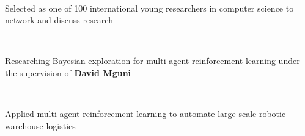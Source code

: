 \documentclass[]{lukas-cv-openfont}
\begin{document}

\noindent
{}
\\
\begin{tightitemize}{1.7em}
    \item Selected as one of 100 international young researchers in computer science to network and discuss research
\end{tightitemize}
\sectionsep

\noindent
{}
\\
\begin{tightitemize}{1.7em}
    \item Researching Bayesian exploration for multi-agent reinforcement learning under the supervision of \textbf{David Mguni}
\end{tightitemize}
\sectionsep

\noindent
{}
\\
\begin{tightitemize}{1.7em}
    \item Applied multi-agent reinforcement learning to automate large-scale robotic warehouse logistics
\end{tightitemize}
\sectionsep

\end{document}
